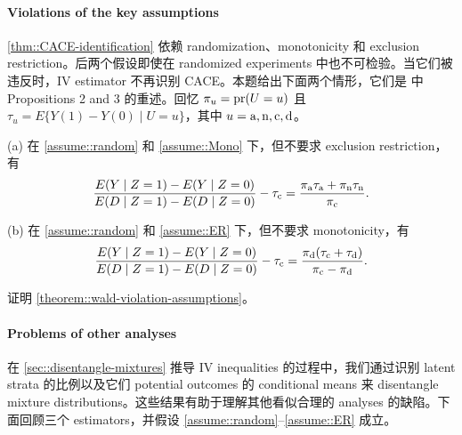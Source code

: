  \paragraph{Violations of the key assumptions}\label{eq::violations-of-IV}

\cref{thm::CACE-identification} 依赖 randomization、monotonicity 和 exclusion restriction。后两个假设即使在 randomized experiments 中也不可检验。当它们被违反时，IV estimator 不再识别 CACE。本题给出下面两个情形，它们是 \citet{angrist1996identification} 中 Propositions 2 and 3 的重述。回忆 $\pi_u = \textup{pr}(U=u)$ 且 $\tau_u = E\{  Y(1) - Y(0) \mid U=u \}$，其中 $u=\textup{a}, \textup{n}, \textup{c}, \textup{d}$。


\begin{theorem}
\label{theorem::wald-violation-assumptions}
(a) 
在 \cref{assume::random} 和 \cref{assume::Mono} 下，但不要求 exclusion restriction，有
$$
\frac{ E(Y\mid Z=1) - E(Y\mid Z=0) }{ E(D\mid Z=1) - E(D \mid Z=0) } - \tau_{\textup{c}} 
= \frac{  \pi_{\textup{a}} \tau_{\textup{a}} + \pi_{\textup{n}} \tau_{\textup{n}}  }{  \pi_{\textup{c}} } .
$$
 

(b)
在 \cref{assume::random} 和 \cref{assume::ER} 下，但不要求 monotonicity，有
$$
\frac{ E(Y\mid Z=1) - E(Y\mid Z=0) }{ E(D\mid Z=1) - E(D \mid Z=0) } - \tau_{\textup{c}} 
= \frac{  \pi_{\textup{d}} (\tau_{\textup{c}} + \tau_{\textup{d}} )  }{   \pi_{\textup{c}} - \pi_{\textup{d}}   }.
$$
\end{theorem}
 
证明 \cref{theorem::wald-violation-assumptions}。

 
 \paragraph{Problems of other analyses}\label{problem::as-treated-analysis}

在 \cref{sec::disentangle-mixtures} 推导 IV inequalities 的过程中，我们通过识别 latent strata 的比例以及它们 potential outcomes 的 conditional means 来 disentangle mixture distributions。这些结果有助于理解其他看似合理的 analyses 的缺陷。下面回顾三个 estimators，并假设 \cref{assume::random}--\cref{assume::ER} 成立。


